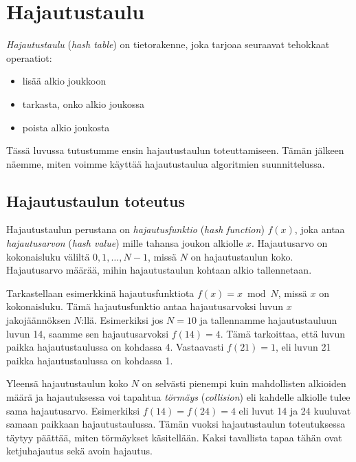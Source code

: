 \chapter{Hajautustaulu}


\emph{Hajautustaulu} (\emph{hash table}) on tietorakenne,
joka tarjoaa seuraavat tehokkaat operaatiot:

\begin{itemize}
\item lisää alkio joukkoon
\item tarkasta, onko alkio joukossa
\item poista alkio joukosta
\end{itemize}

Tässä luvussa tutustumme ensin hajautustaulun toteuttamiseen.
Tämän jälkeen näemme, miten voimme käyttää hajautustaulua
algoritmien suunnittelussa.


\section{Hajautustaulun toteutus}


Hajautustaulun perustana on \emph{hajautusfunktio}
(\emph{hash function}) $f(x)$,
joka antaa \emph{hajautusarvon} (\emph{hash value})
mille tahansa joukon alkiolle $x$.
Hajautusarvo on kokonaisluku väliltä $0,1,\dots,N-1$,
missä $N$ on hajautustaulun koko.
Hajautusarvo määrää, mihin hajautustaulun kohtaan
alkio tallennetaan.

Tarkastellaan esimerkkinä hajautusfunktiota $f(x)=x \bmod N$,
missä $x$ on kokonaisluku.
Tämä hajautusfunktio antaa hajautusarvoksi luvun $x$
jakojäännöksen $N$:llä.
Esimerkiksi jos $N=10$ ja tallennamme hajautustauluun luvun 14,
saamme sen hajautusarvoksi $f(14)=4$.
Tämä tarkoittaa, että luvun paikka hajautustaulussa on kohdassa 4.
Vastaavasti $f(21)=1$, eli luvun 21 paikka hajautustaulussa on
kohdassa 1.


Yleensä hajautustaulun koko $N$ on selvästi pienempi kuin
mahdollisten alkioiden määrä ja
hajautuksessa voi tapahtua \emph{törmäys} (\emph{collision})
eli kahdelle alkiolle tulee sama hajautusarvo.
Esimerkiksi $f(14)=f(24)=4$ eli luvut 14 ja 24 kuuluvat
samaan paikkaan hajautustaulussa.
Tämän vuoksi hajautustaulun toteutuksessa täytyy päättää,
miten tör\-mäykset käsitellään.
Kaksi tavallista tapaa tähän ovat ketjuhajautus sekä avoin hajautus.


